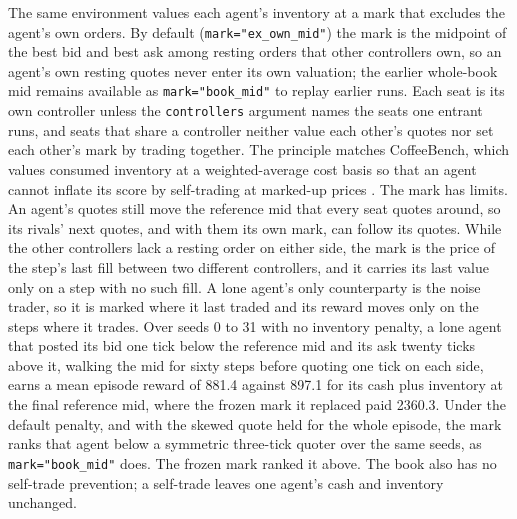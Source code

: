 The same environment values each agent's inventory at a mark that excludes the agent's own orders. By default (\texttt{mark="ex\_own\_mid"}) the mark is the midpoint of the best bid and best ask among resting orders that other controllers own, so an agent's own resting quotes never enter its own valuation; the earlier whole-book mid remains available as \texttt{mark="book\_mid"} to replay earlier runs. Each seat is its own controller unless the \texttt{controllers} argument names the seats one entrant runs, and seats that share a controller neither value each other's quotes nor set each other's mark by trading together. The principle matches CoffeeBench, which values consumed inventory at a weighted-average cost basis so that an agent cannot inflate its score by self-trading at marked-up prices \citep[p.~5]{sugiura2026coffeebench}. The mark has limits. An agent's quotes still move the reference mid that every seat quotes around, so its rivals' next quotes, and with them its own mark, can follow its quotes. While the other controllers lack a resting order on either side, the mark is the price of the step's last fill between two different controllers, and it carries its last value only on a step with no such fill. A lone agent's only counterparty is the noise trader, so it is marked where it last traded and its reward moves only on the steps where it trades. Over seeds 0 to 31 with no inventory penalty, a lone agent that posted its bid one tick below the reference mid and its ask twenty ticks above it, walking the mid for sixty steps before quoting one tick on each side, earns a mean episode reward of 881.4 against 897.1 for its cash plus inventory at the final reference mid, where the frozen mark it replaced paid 2360.3. Under the default penalty, and with the skewed quote held for the whole episode, the mark ranks that agent below a symmetric three-tick quoter over the same seeds, as \texttt{mark="book\_mid"} does. The frozen mark ranked it above. The book also has no self-trade prevention; a self-trade leaves one agent's cash and inventory unchanged.

